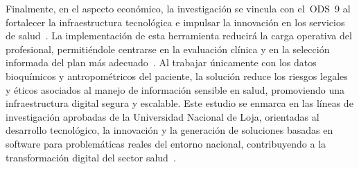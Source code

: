 \documentclass[12pt,a4paper]{article}
\begin{document}
Finalmente, en el aspecto económico, la investigación se vincula con el~ODS~9
al fortalecer la infraestructura tecnológica e impulsar la innovación en los
servicios de salud~\cite{un2024}. La implementación de esta herramienta
reducirá la carga operativa del profesional, permitiéndole centrarse en la
evaluación clínica y en la selección informada del plan más
adecuado~\cite{quichimbo2021}. Al trabajar únicamente con los datos bioquímicos
y antropométricos del paciente, la solución reduce los riesgos legales y éticos
asociados al manejo de información sensible en salud, promoviendo una
infraestructura digital segura y escalable. Este estudio se enmarca en las
líneas de investigación aprobadas de la Universidad Nacional de Loja,
orientadas al desarrollo tecnológico, la innovación y la generación de
soluciones basadas en software para problemáticas reales del entorno nacional,
contribuyendo a la transformación digital del sector salud~\cite{unl2021}.

\clearpage
\printbibliography[title={Referencias}]
\end{document}
